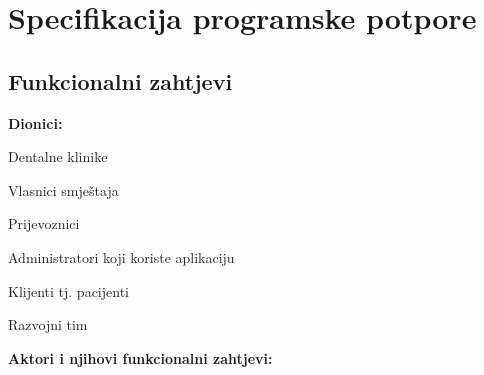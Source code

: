 \chapter{Specifikacija programske potpore}
		
	\section{Funkcionalni zahtjevi}
			
			
			\noindent \textbf{Dionici:}
			
			\begin{packed_enum}
				
				\item Dentalne klinike
				\item Vlasnici smještaja			
				\item Prijevoznici
				\item Administratori koji koriste aplikaciju
				\item Klijenti tj. pacijenti
				\item Razvojni tim
				
				
			\end{packed_enum}
			
			\noindent \textbf{Aktori i njihovi funkcionalni zahtjevi:}
			
